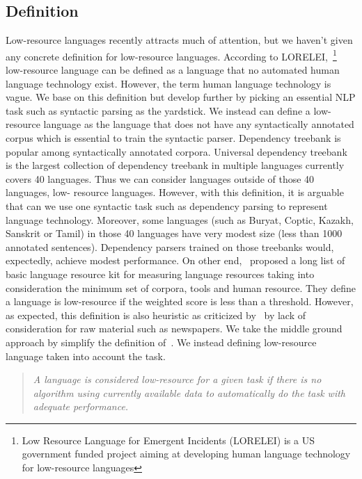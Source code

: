 \documentclass[12pt,twoside,final,hidelinks]{ltthesis}
\theoremstyle{definition}
\begin{document}
\subsection{Definition}
Low-resource languages recently attracts much of attention, but we haven't given 
any concrete definition for low-resource languages. According to LORELEI,~\footnote{Low Resource Language for Emergent Incidents (LORELEI) is a US government funded project aiming at developing 
human language technology for low-resource languages} low-resource 
language can be defined as a language that no automated human language technology exist. 
However, the term human language technology is vague. We base on this definition 
but develop further by picking an essential NLP task such as syntactic parsing as the yardstick. 
We instead can define a low-resource language as the 
language that does not have any syntactically annotated corpus which is essential 
to train the syntactic parser. Dependency treebank is popular among syntactically annotated corpora. 
Universal dependency treebank~\cite{11234/1-1699} 
is the largest collection of dependency treebank in multiple languages currently 
covers 40 languages. Thus we can consider languages outside of those 40 languages, low-
resource languages. However, with this definition, it is arguable that can we use one syntactic task such as 
dependency parsing to represent language technology. Moreover, some languages (such as Buryat, Coptic, Kazakh, Sanskrit or Tamil) in those 40 languages have very modest size (less than 1000 annotated sentences). Dependency parsers trained on those treebanks would, expectedly, achieve 
modest performance. On other end,~ proposed a long list of basic language resource kit for measuring language resources taking into consideration the minimum set of corpora, tools and human resource. They define a language is low-resource if the weighted score is less than a threshold. However, as expected, this definition is also heuristic as criticized by~ by lack of consideration for raw material such as newspapers. 
We take the middle ground approach by simplify the definition of~. 
We instead defining low-resource language taken into account the task. 
\begin{quote}
\textit{A language is considered low-resource for a given task if there is no algorithm using currently available data to automatically do the task 
with adequate performance.}
\end{quote}
\end{document}
